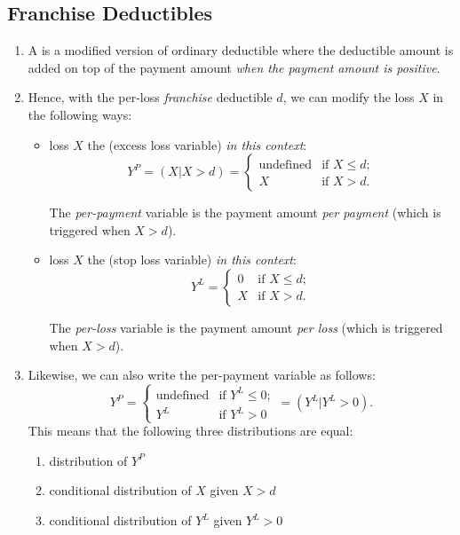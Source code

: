 \subsection{Franchise Deductibles}
\begin{enumerate}
\item A  is a modified version of ordinary
deductible where the deductible amount is added on top of the payment amount
 \emph{when the payment amount  is
positive}.

\item Hence, with the per-loss \emph{franchise} deductible \(d\), we can modify
the loss \(X\) in the following ways:
\begin{itemize}
\item loss \(X\)  the  (excess
loss variable) \emph{in this context}:
\[
Y^P=(X|X>d)=\begin{cases}
\text{undefined}&\text{if \(X\le d\)};\\
X&\text{if \(X>d\)}.
\end{cases}
\]
\begin{note}
The \emph{per-payment} variable is the payment amount \emph{per payment} (which
is triggered when \(X>d\)).
\end{note}
\item loss \(X\)  the  (stop loss
variable) \emph{in this context}:
\[
Y^L
=\begin{cases}
0&\text{if \(X\le d\)};\\
X&\text{if \(X>d\)}.
\end{cases}
\]
\begin{note}
The \emph{per-loss} variable is the payment amount \emph{per loss} (which
is triggered when \(X>d\)).
\end{note}
\end{itemize}

\item \label{it:fran-yp-expr-yl}
Likewise, we can also write the per-payment variable as follows:
\[
Y^P=\begin{cases}
\text{undefined}&\text{if \(Y^L\le 0\)};\\
Y^L&\text{if \(Y^L>0\)}
\end{cases}
=\boxed{(Y^L|Y^L>0)}.
\]
This means that the following three distributions are equal:
\begin{enumerate}
\item distribution of \(Y^P\)
\item conditional distribution of \(X\) given \(X>d\)
\item conditional distribution of \(Y^L\) given \(Y^L>0\)
\end{enumerate}


\end{enumerate}
